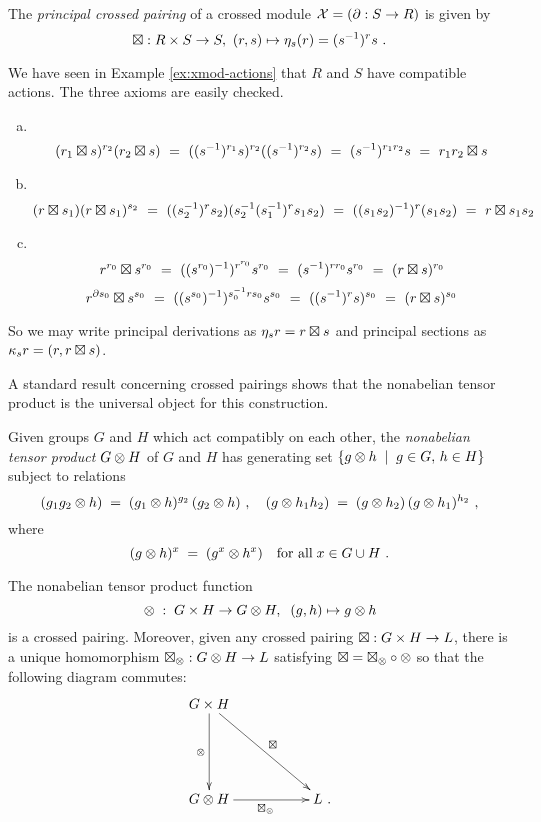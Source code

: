 \begin{lem}
 
The \emph{principal crossed pairing} of a crossed module
$\mathcal{X} = (\partial : S \to R)$ is given by
$$
\boxtimes : R \times S \to S,~ (r,s) \mapsto \eta_s(r) = (s^{-1})^rs\ .
$$
\end{lem}
\begin{pf}
We have seen in Example \ref{ex:xmod-actions}
that $R$ and $S$ have compatible actions.
The three axioms are easily checked.
\begin{enumerate}[(a)]
\item~
$$
(r_1 \boxtimes s)^{r_2}(r_2 \boxtimes s)
~=~ ((s^{-1})^{r_1}s)^{r_2}((s^{-1})^{r_2}s)
~=~ (s^{-1})^{r_1r_2}s
~=~ r_1r_2 \boxtimes s
$$
\item~
$$
(r \boxtimes s_1)(r \boxtimes s_1)^{s_2}
~=~ ((s_2^{-1})^r s_2)(s_2^{-1}(s_1^{-1})^rs_1s_2)
~=~ ((s_1s_2)^{-1})^r (s_1s_2)
~=~ r \boxtimes s_1s_2
$$
\item~
$$
r^{r_0} \boxtimes s^{r_0}
~=~ ((s^{r_0})^{-1})^{r^{r_0}}s^{r_0}
~=~ (s^{-1})^{rr_0}s^{r_0}
~=~(r \boxtimes s)^{r_0}
$$
$$
r^{\partial s_0} \boxtimes s^{s_0}
~=~ ((s^{s_0})^{-1})^{s_0^{-1}rs_0} s^{s_0}
~=~ ((s^{-1})^r s)^{s_0}
~=~ (r \boxtimes s)^{s_0}
$$
\end{enumerate}
\end{pf} 

\noindent
So we may write principal derivations as $\eta_s r = r \boxtimes s$ 
and principal sections as $\kappa_s r = (r, r \boxtimes s)$.

\medskip
A standard result concerning crossed pairings 
shows that the nonabelian tensor product is the universal
object for this construction.

\begin{defn}
Given groups  $G$  and  $H$  which act compatibly on each other,
the \emph{nonabelian tensor product}  $G \otimes H$ 
of  $G$  and  $H$  has generating set
$\{ g \otimes h \;\mid\; g \in G,\, h \in H\}$
subject to relations
\begin{equation} \label{eq:tensrels}
(g_1g_2 \otimes h) \;=\; (g_1 \otimes h)^{g_2}\,(g_2 \otimes h)~, \quad
(g \otimes h_1h_2) \;=\; (g \otimes h_2)\,(g \otimes h_1)^{h_2}~, 
\end{equation}
where  
$$
(g \otimes h)^x \;=\; (g^x \otimes h^x)
\quad \mbox{for all} \; x \in G \cup H~.
$$\end{defn}


\begin{thm} \label{thm:uni-prop}
The nonabelian tensor product function
$$
\otimes \;:\; G \times H \to G \otimes H, \;\; (g,h) \mapsto g \otimes h
$$
is a crossed pairing.
Moreover, given any crossed pairing  $\boxtimes : G \times H \to L$,
there is a unique homomorphism  $\boxtimes_{\otimes} : G \otimes H \to L$
satisfying  $\boxtimes = \boxtimes_{\otimes} \circ \otimes$
so that the following diagram commutes:
$$
\xymatrix{ 
   \ugxh \ar[dd]_{\ot} \ar[ddrr]^{\bt}
         &&   \\
     &&  \\
   \ugth \ar[rr]_{\bt_{\ot}} 
         &&  L ~.
}
$$
\end{thm}

